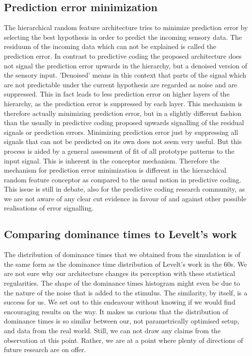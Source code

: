 \documentclass{frontiersSCNS} %
\begin{document}
    \subsection{Prediction error minimization}
    The hierarchical random feature architecture tries to minimize prediction error by selecting the best hypothesis in order to predict the incoming sensory data. The residuum of the incoming data which can not be explained is called the prediction error. In contrast to predictive coding the proposed architecture does not signal the prediction error upwards in the hierarchy, but a denoised version of the  sensory input. 'Denoised' means in this context that parts of the signal which are not predictable under the current hypothesis are regarded as noise and are suppressed. This in fact leads to less prediction error on higher layers of the hierarchy, as the prediction error is suppressed by each layer. This mechanism is therefore actually minimizing prediction error, but in a slightly different fashion than the usually in predictive coding proposed upwards signalling of the residual signals or prediction errors. Minimizing prediction error just by suppressing all signals that can not be predicted on its own does not seem very useful. But this process is aided by a general assessment of fit of all prototype patterns to the input signal. This is inherent in the conceptor mechanism. Therefore the mechanism for prediction error minimization is different in the hierarchical random feature conceptor as compared to the usual notion in predictive coding. This issue is still in debate, also for the predictive coding research community, as we are not aware of any clear cut evidence in favour of and against other possible realisations of error signalling. 
    
    
    \subsection{Comparing dominance times to Levelt's work}
    The distribution of dominance times that we obtained from the simulation is of the same form as the dominance time distribution of Levelt's work in the 60s. We are not sure why our architecture changes its perception with these statistical regularities. The shape of the dominance times histogram might even be due to the nature of the noise that is added to the stimulus.
    The similarity, by itself, is a success for us. We set out to this endeavour without knowing if we would find encouraging results on the way. It makes us curious that the distribution of dominance times is so similar between our, not parametrically optimised setup, and data from the real world. Still, we can not draw any claims from the observation at this point. Rather, we are at a point where plenty of directions of future research are on offer.
\end{document}
